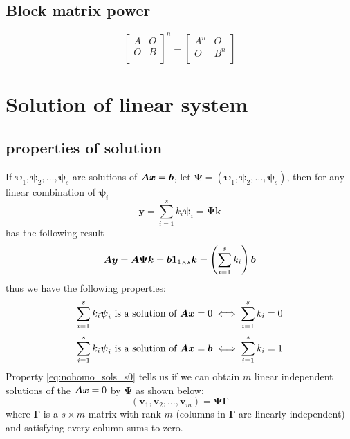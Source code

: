 \documentclass{overview}
\begin{document}
\subsection{Block matrix power}
\[
\begin{bmatrix}
	A & O \\
	O & B \\
\end{bmatrix}^{n}
=
\begin{bmatrix}
	A^{n} & O \\
	O & B^{n} \\
\end{bmatrix}
\] 

\section{Solution of linear system}

\subsection{properties of solution}

If $\boldsymbol{\psi}_1, \boldsymbol{\psi}_2, \dots, \boldsymbol{\psi}_s$ are solutions
of $\boldsymbol{A} \boldsymbol{x}=\boldsymbol{b}$, let $\boldsymbol{\Psi}=(\boldsymbol{\psi}_1, \boldsymbol{\psi}_2, \dots, \boldsymbol{\psi}_s)$,
then for any linear combination of $\boldsymbol{\psi}_i$ 
\[
\boldsymbol{y} = \sum_{i=1}^{s} k_i \boldsymbol{\psi}_i= \boldsymbol{\Psi} \boldsymbol{k}
\] 
has the following result 
\[ \boldsymbol{A} \boldsymbol{y} = \boldsymbol{A} \boldsymbol{\Psi} \boldsymbol{k}
= \boldsymbol{b}\boldsymbol{1}_{1\times s} \boldsymbol{k}
= \left(\sum_{i=1}^{s} k_i\right) \boldsymbol{b} \]
thus we have the following properties:
\begin{equation}
\sum_{i=1}^{s} k_i \boldsymbol{\psi}_i
\text{ is a solution of } \boldsymbol{A} \boldsymbol{x}=0 \iff \sum_{i=1}^{s} k_i = 0
\label{eq:nohomo_sols_s0}
\end{equation}
\begin{equation}
	\sum_{i=1}^{s} k_i \boldsymbol{\psi}_i
\text{ is a solution of } \boldsymbol{A} \boldsymbol{x}=\boldsymbol{b} \iff \sum_{i=1}^{s} k_i = 1
\label{eq:nohomo_sols_s1}
\end{equation}
Property \eqref{eq:nohomo_sols_s0} tells us if we can obtain $m$ linear independent
solutions of the $\boldsymbol{A} \boldsymbol{x}=0$ by $\boldsymbol{\Psi}$ as shown below:
\[
	(\boldsymbol{v}_1, \boldsymbol{v}_2, \dots, \boldsymbol{v}_m) =
	\boldsymbol{\Psi}\boldsymbol{\Gamma}
\] 
where $\boldsymbol{\Gamma}$ is a $s\times m$ matrix with rank $m$ (columns in
$\boldsymbol{\Gamma}$ are linearly independent) and satisfying every column sums to zero.
\end{document}
